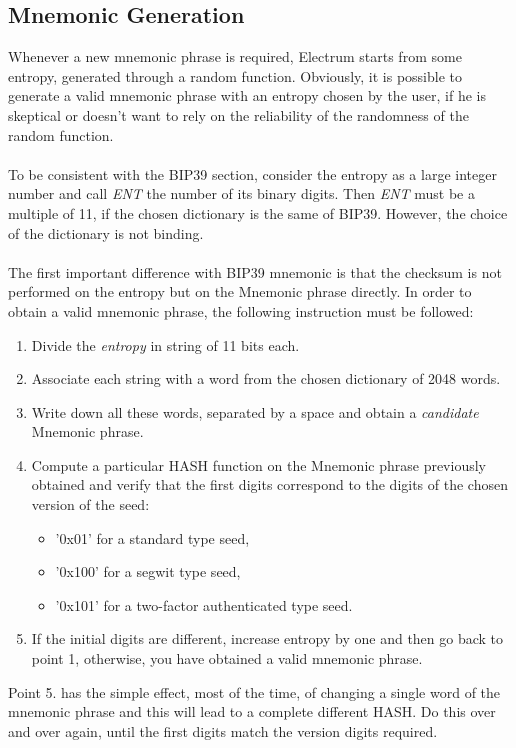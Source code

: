 \subsection{Mnemonic Generation}
Whenever a new mnemonic phrase is required, Electrum starts from some entropy, generated through a random function. Obviously, it is possible to generate a valid mnemonic phrase with an entropy chosen by the user, if he is skeptical or doesn't want to rely on the reliability of the randomness of the random function.
\\ \\
To be consistent with the BIP39 section, consider the entropy as a large integer number and call \textit{ENT} the number of its binary digits. Then \textit{ENT} must be a multiple of 11, if the chosen dictionary is the same of BIP39. However, the choice of the dictionary is not binding.
\\ \\
The first important difference with BIP39 mnemonic is that the checksum is not performed on the entropy but on the Mnemonic phrase directly. In order to obtain a valid mnemonic phrase, the following instruction must be followed:
\begin{enumerate}
	\item Divide the \textit{entropy} in string of 11 bits each.
	\item Associate each string with a word from the chosen dictionary of 2048 words.
	\item Write down all these words, separated by a space and obtain a \textit{candidate} Mnemonic phrase.
	\item Compute a particular HASH function on the Mnemonic phrase previously obtained and verify that the first digits correspond to the digits of the chosen version of the seed:
	\begin{itemize}
		\item '0x01' for a standard type seed,
		\item '0x100' for a segwit type seed,
		\item '0x101' for a two-factor authenticated type seed.
	\end{itemize}
	\item If the initial digits are different, increase entropy by one and then go back to point 1, otherwise, you have obtained a valid mnemonic phrase.
\end{enumerate}
Point 5. has the simple effect, most of the time, of changing a single word of the mnemonic phrase and this will lead to a complete different HASH. Do this over and over again, until the first digits match the version digits required.

